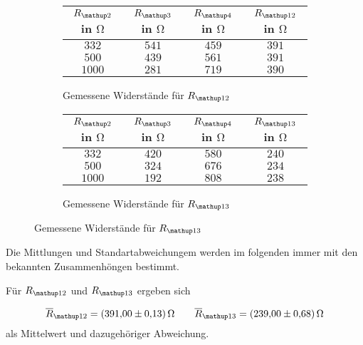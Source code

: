 \begin{figure}
\begin{subfigure}{0.49\textwidth}
\centering
\hspace{-0.25cm}
\caption{Gemessene Widerstände für $R\ua{12}$}
  \label{tab:wid_r12}
\begin{tabular}{S S S S}
      \toprule
    {$R\ua{2}$ in $\si{\ohm}$} &  {$R\ua{3}$ in $\si{\ohm}$} & {$R\ua{4}$ in $\si{\ohm}$} &{$R\ua{12}$ in $\si{\ohm}$}  \\
    \midrule
     {$\num{332}$} & {$\num{541}$} &  {$\num{459}$}& {$\num{391}$}  \\
     {$\num{500}$} & {$\num{439}$}  & {$\num{561}$} & {$\num{391}$}  \\
     {$\num{1000}$} & {$\num{281}$}  & {$\num{719}$} & {$\num{390}$}  \\
     \bottomrule
	\end{tabular}
\end{subfigure}
\hspace{0.5cm}
\begin{subfigure}{0.49\textwidth}
\centering
 \caption{Gemessene Widerstände für $R\ua{13}$}
  \label{tab:wid_r13}
\begin{tabular}{S S S S}
      \toprule
    {$R\ua{2}$ in $\si{\ohm}$} &  {$R\ua{3}$ in $\si{\ohm}$} & {$R\ua{4}$ in $\si{\ohm}$} & {$R\ua{13}$ in $\si{\ohm}$}  \\
    \midrule
     {$\num{332}$} & {$\num{420}$}  & {$\num{580}$} & {$\num{240}$}  \\
     {$\num{500}$} & {$\num{324}$}  & {$\num{676}$} & {$\num{234}$}  \\
     {$\num{1000}$} & {$\num{192}$} &  {$\num{808}$}& {$\num{238}$}  \\
     \bottomrule
  \end{tabular}
\end{subfigure}
\label{fig:tabellen_rx_a}
\end{figure}

Die Mittlungen und Standartabweichungem werden im folgenden immer 
mit den bekannten Zusammenhöngen bestimmt.

Für $R_{\map{12}}$ und $R_{\map{13}}$ ergeben sich 

\begin{equation}
\label{eq:wert_r12_r_13}
\overline{R}_{\map{12}}=\SI{391\pm0.13}{\ohm}\qquad \overline{R}_{\map{13}}=\SI{239\pm0.68}{\ohm}
\end{equation}
als Mittelwert und dazugehöriger Abweichung.

